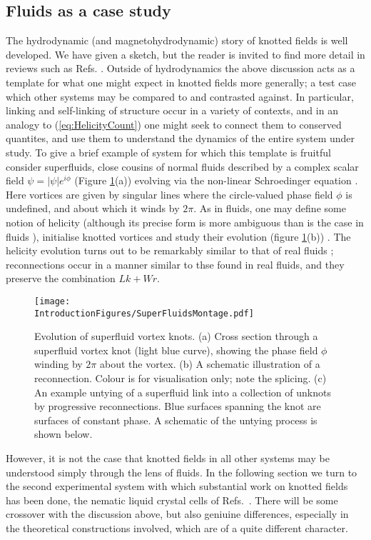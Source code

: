 \subsection{Fluids as a case study}
The hydrodynamic (and magnetohydrodynamic) story of knotted fields is well developed. We have given a sketch, but the reader is invited to find more detail in reviews such as Refs. \citep{Moffatt2014, Irvine2018}. Outside of hydrodynamics the above discussion acts as a template for what one might expect in knotted fields more generally; a test case which other systems may be compared to and contrasted against. In particular, linking and self-linking of structure occur in a variety of contexts, and in an analogy to (\ref{eq:HelicityCount}) one might seek to connect them to conserved quantites, and use them to understand the dynamics of the entire system under study. To give a brief example of system for which this template is fruitful consider superfluids, close cousins of normal fluids described by a complex scalar field $\psi = |\psi| e^{i \phi}$ (Figure \ref{fig:SuperFluidMontage}(a)) evolving via the non-linear Schroedinger equation \citep{Kleckner2013}. Here vortices are given by singular lines where the circle-valued phase field $\phi$ is undefined, and about which it winds by $2\pi$. As in fluids, one may define some notion of helicity (although its precise form is more ambiguous than is the case in fluids \citep{Salman}), initialise knotted vortices and study their evolution (figure \ref{fig:SuperFluidMontage}(b)) \citep{Kleckner2013,Scheeler2014}. The helicity evolution turns out to be remarkably similar to that of real fluids \citep{Kleckner2013,Scheeler2014}; reconnections occur in a manner similar to thse found in real fluids, and they preserve the combination $Lk+Wr$.  
\begin{figure}[htbp]
\centering
\texttt{[image: \\IntroductionFigures/SuperFluidsMontage.pdf]}
\caption{Evolution of superfluid vortex knots. (a) Cross section through a superfluid vortex knot (light blue curve), showing the phase field $\phi$ winding by $2 \pi$ about the vortex. (b) A schematic illustration of a reconnection. Colour is for visualisation only; note the splicing. (c) An example untying of a superfluid link into a collection of unknots by progressive reconnections. Blue surfaces spanning the knot are surfaces of constant phase. A schematic of the untying process is shown below.}
\label{fig:SuperFluidMontage}
\end{figure}

However, it is not the case that knotted fields in all other systems may be understood simply through the lens of fluids. In the following section we turn to the second experimental system with which substantial work on knotted fields has been done, the nematic liquid crystal cells of Refs.~\citep{Tkalec2011,Tasinkevych2014,Copar2015}. There will be some crossover with the discussion above, but also geniuine differences, especially in the theoretical constructions involved, which are of a quite different character. 
